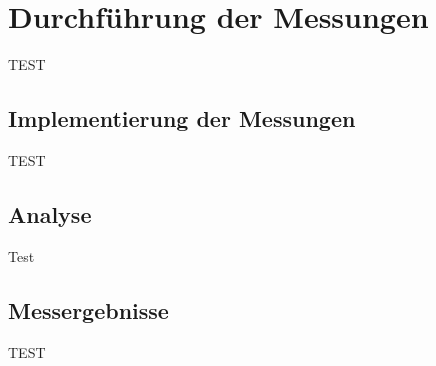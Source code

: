 \chapter{Durchführung der Messungen}

TEST

\section{Implementierung der Messungen}
TEST
\section{Analyse}
Test
\section{Messergebnisse}
TEST